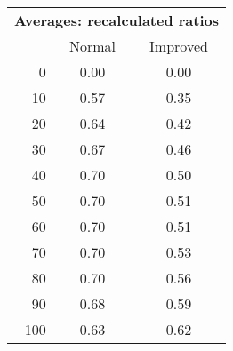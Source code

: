 \begin{tabular}{r|cc}
      \multicolumn{3}{c}{{\bf Averages: recalculated ratios }} \\
      & Normal & Improved \\ \hline\hline
0
& 0.00
& 0.00
\\
10
& 0.57
& 0.35
\\
20
& 0.64
& 0.42
\\
30
& 0.67
& 0.46
\\
40
& 0.70
& 0.50
\\
50
& 0.70
& 0.51
\\
60
& 0.70
& 0.51
\\
70
& 0.70
& 0.53
\\
80
& 0.70
& 0.56
\\
90
& 0.68
& 0.59
\\
100
& 0.63
& 0.62
\\
\end{tabular}
